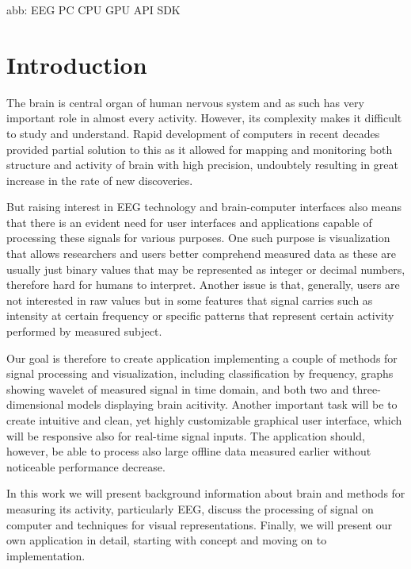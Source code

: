 abb:
EEG
PC
CPU
GPU
API
SDK

\chapter{Introduction}
The brain is central organ of human nervous system and as such has very
important role in almost every activity. However, its complexity makes it
difficult to study and understand. Rapid development of computers in recent
decades provided partial solution to this as it allowed for mapping and
monitoring both structure and activity of brain with high precision,
undoubtely resulting in great increase in the rate of new discoveries.

But raising interest in EEG technology and brain-computer interfaces also means
that there is an evident need for user interfaces and applications capable of
processing these signals for various purposes. One such purpose is visualization
that allows researchers and users better comprehend measured data as these are
usually just binary values that may be represented as integer or decimal
numbers, therefore hard for humans to interpret. Another issue is that,
generally, users are not interested in raw values but in some features that
signal carries such as intensity at certain frequency or specific patterns that
represent certain activity performed by measured subject.

Our goal is therefore to create application implementing a couple of methods for
signal processing and visualization, including classification by frequency, graphs
showing wavelet of measured signal in time domain, and both two and
three-dimensional models displaying brain acitivity. Another important task will
be to create intuitive and clean, yet highly customizable graphical user
interface, which will be responsive also for real-time signal inputs. The
application should, however, be able to process also large offline data measured
earlier without noticeable performance decrease.

In this work we will present background information about brain and methods for
measuring its activity, particularly EEG, discuss the processing of signal on
computer and techniques for visual representations. Finally, we will present our
own application in detail, starting with concept and moving on to implementation.
 
